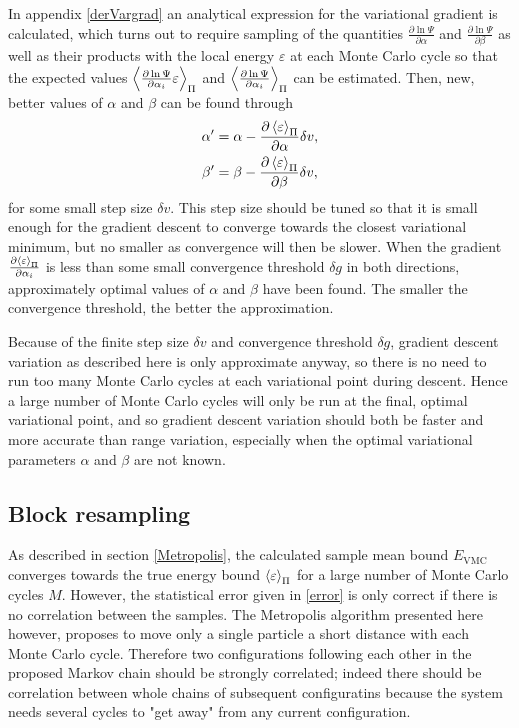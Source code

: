\documentclass[a4paper,8pt]{article}
\begin{document}
\begin{multicols}{2}
In appendix \ref{derVargrad} an analytical expression for the variational gradient is calculated, which turns out to require sampling of the quantities $\frac{\partial\ln\Psi}{\partial\alpha}$ and $\frac{\partial\ln\Psi}{\partial\beta}$ as well as their products with the local energy $\varepsilon$ at each Monte Carlo cycle so that the expected values $\ev{\frac{\partial\ln\Psi}{\partial\alpha_i}\varepsilon}_\Pi$ and $\ev{\frac{\partial\ln\Psi}{\partial\alpha_i}}_\Pi$ can be estimated. Then, new, better values of $\alpha$ and $\beta$ can be found through
\begin{align}
\alpha' &= \alpha-\frac{\partial\ev{\varepsilon}_\Pi}{\partial\alpha}\delta v, \\
\beta' &= \beta-\frac{\partial\ev{\varepsilon}_\Pi}{\partial\beta}\delta v,
\end{align}
for some small step size $\delta v$. This step size should be tuned so that it is small enough for the gradient descent to converge towards the closest variational minimum, but no smaller as convergence will then be slower. When the gradient $\frac{\partial\ev{\varepsilon}_\Pi}{\partial\alpha_i}$ is less than some small convergence threshold $\delta g$ in both directions, approximately optimal values of $\alpha$ and $\beta$ have been found. The smaller the convergence threshold, the better the approximation.

Because of the finite step size $\delta v$ and convergence threshold $\delta g$, gradient descent variation as described here is only approximate anyway, so there is no need to run too many Monte Carlo cycles at each variational point during descent. Hence a large number of Monte Carlo cycles will only be run at the final, optimal variational point, and so gradient descent variation should both be faster and more accurate than range variation, especially when the optimal variational parameters $\alpha$ and $\beta$ are not known.


\subsection{Block resampling}\label{Bresampling}
As described in section \ref{Metropolis}, the calculated sample mean bound $E_\text{VMC}$ converges towards the true energy bound $\ev{\varepsilon}_\Pi$ for a large number of Monte Carlo cycles $M$. However, the statistical error given in \eqref{error} is only correct if there is no correlation between the samples. The Metropolis algorithm presented here however, proposes to move only a single particle a short distance with each Monte Carlo cycle. Therefore two configurations following each other in the proposed Markov chain should be strongly correlated; indeed there should be correlation between whole chains of subsequent configuratins because the system needs several cycles to "get away" from any current configuration.


\end{multicols}
\end{document}
